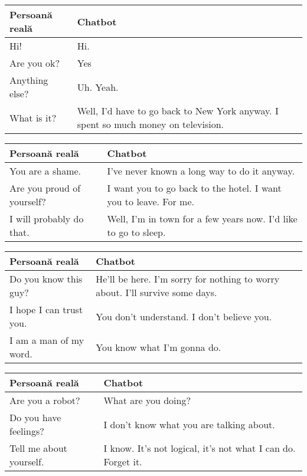 \begin{center}
  \begin{tabular}{ | m{6.5cm} | m{6.5cm} |}
    \hline
    Persoan\u a real\u a & Chatbot \\ \hline
    Hi! & Hi. \\ 
    Are you ok? & Yes \\ 
    Anything else? & Uh. Yeah. \\
    What is it? & Well, I'd have to go back to New York anyway. I spent so much money on television. \\
    \hline
  \end{tabular}
\end{center}

\begin{center}
  \begin{tabular}{ | m{6.5cm} | m{6.5cm} |}
    \hline
    Persoan\u a real\u a & Chatbot \\ \hline
    You are a shame. & I've never known a long way to do it anyway. \\ 
    Are you proud of yourself? & I want you to go back to the hotel. I want you to leave. For me. \\ 
    I will probably do that. & Well, I'm in town for a few years now. I'd like to go to sleep. \\
    \hline
  \end{tabular}
\end{center}

\begin{center}
  \begin{tabular}{ | m{6.5cm} | m{6.5cm} |}
    \hline
    Persoan\u a real\u a & Chatbot \\ \hline
    Do you know this guy? & He'll be here. I'm sorry for nothing to worry about. I'll survive some days. \\ 
    I hope I can trust you. & You don't understand. I don't believe you. \\ 
    I am a man of my word. & You know what I'm gonna do. \\
    \hline
  \end{tabular}
\end{center}

\begin{center}
  \begin{tabular}{ | m{6.5cm} | m{6.5cm} |}
    \hline
    Persoan\u a real\u a & Chatbot \\ \hline
    Are you a robot? & What are you doing? \\
    Do you have feelings? & I don't know what you are talking about. \\
    Tell me about yourself. & I know. It's not logical, it's not what I can do. Forget it. \\
    \hline
  \end{tabular}
\end{center}

